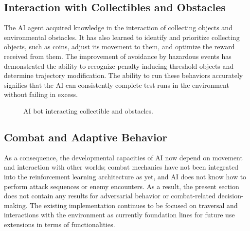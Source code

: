 \documentclass[12pt,oneside,openright,a4paper]{cpe-english-project}
\begin{document}
\subsection{Interaction with Collectibles and Obstacles}
The AI agent acquired knowledge in the interaction of collecting objects and environmental obstacles. It has also learned to identify and prioritize collecting objects, such as coins, adjust its movement to them, and optimize the reward received from them. The improvement of avoidance by hazardous events has demonstrated the ability to recognize penalty-inducing-threshold objects and determine trajectory modification. The ability to run these behaviors accurately signifies that the AI can consistently complete test runs in the environment without failing in excess.
\begin{figure}[!h]
\centering
{}
\caption{AI bot interacting collectible and obstacles.}\label{fig:AIInt}
\end{figure}
\subsection{Combat and Adaptive Behavior}
As a consequence, the developmental capacities of AI now depend on movement and interaction with other worlds; combat mechanics have not been integrated into the reinforcement learning architecture as yet, and AI does not know how to perform attack sequences or enemy encounters. As a result, the present section does not contain any results for adversarial behavior or combat-related decision-making. The existing implementation continues to be focused on traversal and interactions with the environment as currently foundation lines for future use extensions in terms of functionalities.
\end{document}
